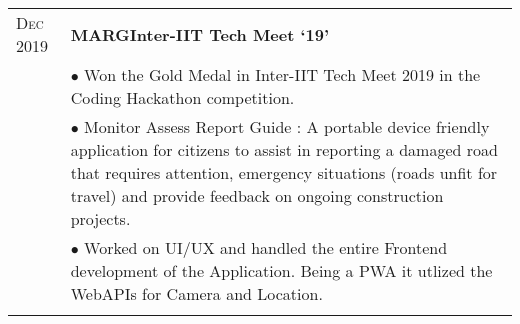 \documentclass[a4paper,12pt]{extarticle} %
\let\oldtextbf\textbf
\renewcommand{\textbf}[1]{\textcolor{bold}{\oldtextbf{#1}}}
\begin{document}
\begin{tabularx}{\linewidth}{ l | X }

  \textsc{Dec 2019}
   & \textbf{MARG}\hfill\textbf{Inter-IIT Tech Meet `19'}                                                                                                        \\

   & {$\bullet$ Won the Gold Medal in Inter-IIT Tech Meet 2019 in the Coding Hackathon competition.}                                                             \\

   & {$\bullet$ Monitor Assess Report Guide : A portable device friendly application for citizens to assist in reporting a damaged road that requires attention,
      emergency situations (roads unfit for travel) and provide feedback on ongoing construction projects.
    }                                                                                                                                                            \\
   & {$\bullet$ Worked on UI/UX and handled the entire Frontend development of the Application. Being a PWA it utlized the WebAPIs for Camera and Location.}     \\

  \multicolumn{2}{c}{}                                                                                                                                           \\



\end{tabularx}
\end{document}

